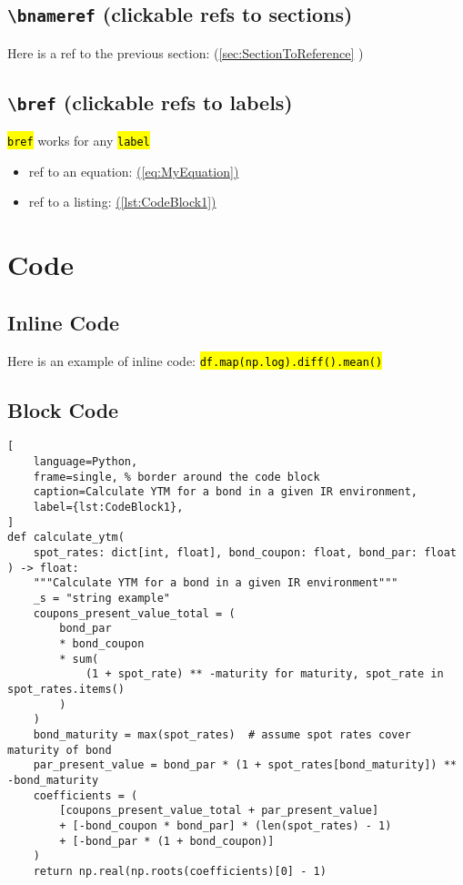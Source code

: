 \documentclass[titlepage]{article}
\newcommand{\bref}[1]{\hyperref[#1]{(\ref*{#1})}}
\newcommand{\bnameref}[1]{(\ref{#1} \nameref{#1})}
\newcommand{\code}[1]{\texttt{\textcolor{RedViolet}{\hl{\;#1\;}}}}
\begin{document}
\subsection{\texttt{{\normalfont \textbackslash}bnameref} (clickable refs to sections)}
Here is a ref to the previous section:
\bnameref{sec:SectionToReference}

\subsection{\texttt{{\normalfont \textbackslash}bref} (clickable refs to labels)}

\code{{\normalfont \textbackslash}bref}
works for any
\code{{\normalfont \textbackslash}label}

\begin{itemize}
    \item ref to an equation: \bref{eq:MyEquation}
    \item ref to a listing: \bref{lst:CodeBlock1}
\end{itemize}

\section{Code}

\subsection{Inline Code}

Here is an example of inline code:
\code{df.map(np.log).diff().mean()}

\subsection{Block Code}

\begin{minipage}{\linewidth}
\begin{lstlisting}[
    language=Python,
    frame=single, % border around the code block
    caption=Calculate YTM for a bond in a given IR environment,
    label={lst:CodeBlock1},
]
def calculate_ytm(
    spot_rates: dict[int, float], bond_coupon: float, bond_par: float
) -> float:
    """Calculate YTM for a bond in a given IR environment"""
    _s = "string example"
    coupons_present_value_total = (
        bond_par
        * bond_coupon
        * sum(
            (1 + spot_rate) ** -maturity for maturity, spot_rate in spot_rates.items()
        )
    )
    bond_maturity = max(spot_rates)  # assume spot rates cover maturity of bond
    par_present_value = bond_par * (1 + spot_rates[bond_maturity]) ** -bond_maturity
    coefficients = (
        [coupons_present_value_total + par_present_value]
        + [-bond_coupon * bond_par] * (len(spot_rates) - 1)
        + [-bond_par * (1 + bond_coupon)]
    )
    return np.real(np.roots(coefficients)[0] - 1)
\end{lstlisting}
\end{minipage}
\end{document}
